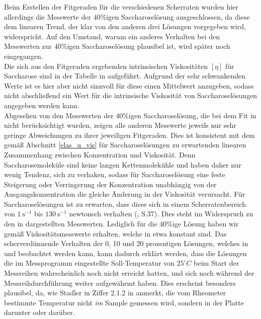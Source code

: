 \documentclass[11pt,a4paper,oneside]{scrartcl}
\begin{document}
 Beim Erstellen der Fitgeraden für die verschiedenen Scherraten wurden hier allerdings die Messwerte der $40\%$igen Saccharoselösung ausgeschlossen, da diese dem linearen Trend, der klar von den anderen drei Lösungen vorgegeben wird, widerspricht. Auf den Umstand, warum ein anderes Verhalten bei den Messwerten zur $40\%$igen Saccharoselösung plausibel ist, wird später noch eingegangen.\\
Die sich aus den Fitgeraden
ergebenden intrinsischen Viskositäten $[\eta]$ für Saccharose sind in der Tabelle in  aufgeführt. Aufgrund der sehr schwankenden Werte ist es hier aber nicht sinnvoll für diese einen Mittelwert
anzugeben, sodass nicht abschließend ein Wert für die intrinsische Viskosität von Saccharoselösungen angegeben werden kann.\\
 Abgesehen von den Messwerten der $40\%$igen Saccharoselösung, die bei dem Fit in  nicht berücksichtigt wurden, zeigen alle anderen Messwerte jeweils nur sehr geringe Abweichungen zu ihrer jeweiligen Fitgeraden. Dies ist konsistent mit dem gemäß Abschnitt \ref{elas_u_vis} für Saccharoselösungen zu erwartenden linearen Zusammenhang zwischen Konzentration und Viskosität. Denn Saccharosemoleküle sind keine langen Kettenmolekühle und haben daher nur wenig
Tendenz, sich zu verhaken, sodass für Saccharoselösung eine feste Steigerung oder Verringerung der Konzentration unabhängig von der Ausgangskonzentration die gleiche Änderung in der Viskosität verursacht.
Für Saccharoselösungen ist zu erwarten, dass diese sich in einem Scherratenbereich von $1\ \mathrm s^{-1}$ bis $130\ \mathrm s^{-1}$ newtonsch verhalten (\cite{petra}, S.37). Dies steht im Widerspruch zu den in  dargestellten Messwerten. Lediglich für die $40\%$ige Lösung
haben wir gemäß  Viskositätsmesswerte erhalten, welche in etwa konstant sind. Das scherverdünnende Verhalten der 0, 10 und 20 prozentigen Lösungen, welches in  und  beobachtet werden kann, kann dadurch erklärt werden, dass die Lösungen die im Messprogramm eingestellte Soll-Temperatur von $25^{\circ}C$ beim Start der Messreihen wahrscheinlich noch nicht erreicht hatten, und sich noch während der Messreihdurchführung
weiter aufgewährmt haben. Dies erscheint besonders plausibel, da, wie Stadler in Ziffer 2.1.2 in  \cite{Stadler2014} anmerkt, die vom Rheometer bestimmte Temperatur nicht \emph{im} Sample gemessen wird, sondern in der Platte darunter oder darüber.
\end{document}
